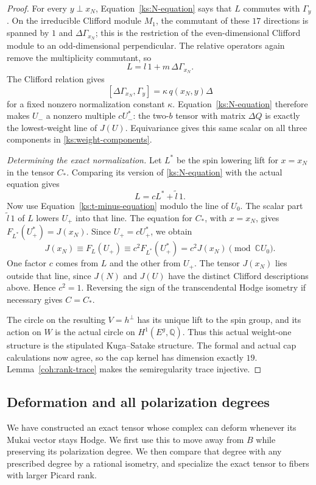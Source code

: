 \documentclass[11pt]{article}
\numberwithin{equation}{section}
\theoremstyle{definition}
\theoremstyle{remark}
\newcommand{\Q}{\mathbb Q}
\newcommand{\C}{\mathbb C}
\begin{document}
\begin{proof}
For every $y\perp x_N$, Equation~\eqref{ks:N-equation}
says that $L$ commutes with $\Gamma_y$.  On the irreducible
Clifford module $M_1$, the commutant of these $17$
directions is spanned by $1$ and $\Delta\Gamma_{x_N}$;
this is the restriction of the even-dimensional Clifford
module to an odd-dimensional perpendicular.  The relative
operators again remove the multiplicity commutant, so
\[
 L=l\,1+m\,\Delta\Gamma_{x_N}.
\]
The Clifford relation gives
\[
 [\Delta\Gamma_{x_N},\Gamma_y]
   =\kappa\,q(x_N,y)\Delta
\]
for a fixed nonzero normalization constant $\kappa$.
Equation~\eqref{ks:N-equation} therefore makes $U_-$ a
nonzero multiple $cU_-^*$: the two-$b$ tensor with matrix
$\Delta Q$ is exactly the lowest-weight line of $J(U)$.
Equivariance gives this same scalar on all three
components in \eqref{ks:weight-components}.

\emph{Determining the exact normalization.}
Let $L^*$ be the spin lowering lift for
$x=x_N$ in the tensor $C_*$.  Comparing its version of
\eqref{ks:N-equation} with the actual equation gives
\[
 L=cL^*+\widetilde l\,1.
\]
Now use Equation~\eqref{ks:t-minus-equation} modulo the line
of $U_0$.  The scalar part $\widetilde l\,1$ of $L$
lowers $U_+$ into that line.  The equation for $C_*$,
with $x=x_N$, gives $F_{L^*}(U_+^*)=J(x_N)$.
Since $U_+=cU_+^*$, we obtain
\[
 J(x_N)\equiv F_L(U_+)
   \equiv c^2 F_{L^*}(U_+^*)=c^2J(x_N)
       \pmod{\C U_0}.
\]
One factor $c$ comes from $L$ and the other from $U_+$.
The tensor
$J(x_N)$ lies outside that line, since $J(N)$ and $J(U)$
have the distinct Clifford descriptions above.  Hence
$c^2=1$.  Reversing the sign of the transcendental Hodge
isometry if necessary gives $C=C_*$.

The circle on the resulting $V=h^\perp$ has its unique
lift to the spin group, and its action on $W$ is the
actual circle on $H^1(E^g,\Q)$.  Thus this actual
weight-one structure is the stipulated Kuga--Satake
structure.  The formal and actual cap calculations now
agree, so the cap kernel has dimension exactly $19$.
Lemma~\ref{coh:rank-trace} makes the
semiregularity trace injective.
\end{proof}

\subsection{Deformation and all polarization degrees}
\label{ks:deformation}

We have constructed an exact tensor whose complex can deform
whenever its Mukai vector stays Hodge.  We first use this to
move away from $B$ while preserving its polarization degree.
We then compare that degree with any prescribed degree by a
rational isometry, and specialize the exact tensor to fibers
with larger Picard rank.
\end{document}
